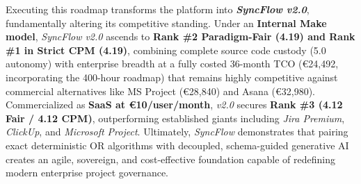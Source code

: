 \noindent Executing this roadmap transforms the platform into \textbf{\textit{SyncFlow v2.0}}, fundamentally altering its competitive standing. Under an \textbf{Internal Make model}, \textit{SyncFlow v2.0} ascends to \textbf{Rank \#2 Paradigm-Fair (4.19) and Rank \#1 in Strict CPM (4.19)}, combining complete source code custody (5.0 autonomy) with enterprise breadth at a fully costed 36-month TCO (€24,492, incorporating the 400-hour roadmap) that remains highly competitive against commercial alternatives like MS Project (€28,840) and Asana (€32,980). Commercialized as \textbf{SaaS at €10/user/month}, \textit{v2.0} secures \textbf{Rank \#3 (4.12 Fair / 4.12 CPM)}, outperforming established giants including \textit{Jira Premium}, \textit{ClickUp}, and \textit{Microsoft Project}. Ultimately, \textit{SyncFlow} demonstrates that pairing exact deterministic OR algorithms with decoupled, schema-guided generative AI creates an agile, sovereign, and cost-effective foundation capable of redefining modern enterprise project governance.
